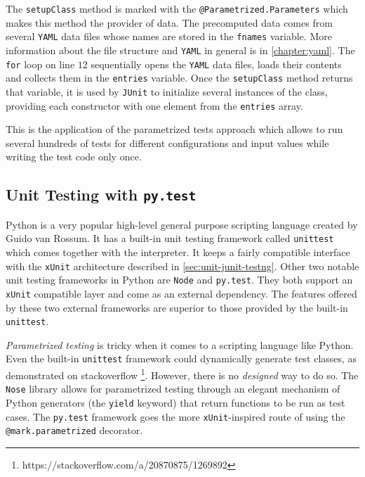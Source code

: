 The \texttt{setupClass} method is marked with the \texttt{@Parametrized.Parameters} which makes this method the provider of data. The precomputed data comes from several \texttt{YAML} data files whose names are stored in the \texttt{fnames} variable. More information about the file structure and \texttt{YAML} in general is in \ref{chapter:yaml}. The \texttt{for} loop on line \(12\) sequentially opens the \texttt{YAML} data files, loads their contents and collects them in the \texttt{entries} variable. Once the \texttt{setupClass} method returns that variable, it is used by \texttt{JUnit} to initialize several instances of the class, providing each constructor with one element from the \texttt{entries} array.

This is the application of the parametrized tests approach which allows to run several hundreds of tests for different configurations and input values while writing the test code only once.

\subsection{Unit Testing with \texttt{py.test}}
\label{sec:unit-pytest}

Python is a very popular high-level general purpose scripting language created by Guido van Rossum. It has a built-in unit testing framework called \texttt{unittest} which comes together with the interpreter. It keeps a fairly compatible interface with the \texttt{xUnit} architecture described in \ref{sec:unit-junit-testng}. Other two notable unit testing frameworks in Python are \texttt{Node} and \texttt{py.test}. They both support an \texttt{xUnit} compatible layer and come as an external dependency. The features offered by these two external frameworks are superior to those provided by the built-in \texttt{unittest}.

\emph{Parametrized testing} is tricky when it comes to a scripting language like Python. Even the built-in \texttt{unittest} framework could dynamically generate test classes, as demonstrated on stackoverflow \footnote{https://stackoverflow.com/a/20870875/1269892}. However, there is no \emph{designed} way to do so. The \texttt{Nose} library allows for parametrized testing through an elegant mechanism of Python generators (the \texttt{yield} keyword) that return functions to be run as test cases. The \texttt{py.test} framework goes the more \texttt{xUnit}-inspired route of using the \texttt{@mark.parametrized} decorator.

